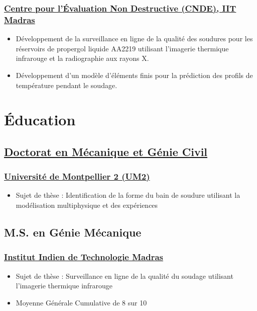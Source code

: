 \documentclass{my_cv}%
\begin{document}
\subsubsection{\href{https://www.cnde.in/}{Centre pour l'Évaluation Non Destructive (CNDE), IIT Madras}}
\begin{itemize}[leftmargin=0.15in]
\setlength\itemsep{-0.1em}
\color{mygray}
\item Développement de la surveillance en ligne de la qualité des soudures pour les réservoirs de propergol liquide AA2219 utilisant l'imagerie thermique infrarouge et la radiographie aux rayons X.
\item Développement d'un modèle d'éléments finis pour la prédiction des profils de température pendant le soudage.
\end{itemize}
\section{Éducation}
\vspace{2em}
\subsection{\href{https://adum.fr/as/ed/cv.pl?mat=39446&site=adumR} {Doctorat en Mécanique et Génie Civil}}
\subsubsection{\faInstitution \hspace{0.2em} \href{https://www.umontpellier.fr/en/}{Université de Montpellier 2 (UM2)}}
\begin{itemize}[leftmargin=0.15in]
\setlength\itemsep{-0.1em}
\color{mygray}
\item Sujet de thèse : Identification de la forme du bain de soudure utilisant la modélisation multiphysique et des expériences
\end{itemize}
{\color{mygray1} \hdashrule[0.1ex]{18.8cm}{0.2mm}{1mm}}
\subsection{M.S. en Génie Mécanique}
\subsubsection{\faInstitution \hspace{0.2em} \href{https://www.iitm.ac.in/}{Institut Indien de Technologie Madras}}
\begin{itemize}[leftmargin=0.15in]
\setlength\itemsep{-0.1em}
\color{mygray}
\item Sujet de thèse : Surveillance en ligne de la qualité du soudage utilisant l'imagerie thermique infrarouge
\item Moyenne Générale Cumulative de 8 sur 10
\end{itemize}
{\color{mygray1} \hdashrule[0.1ex]{18.8cm}{0.2mm}{1mm}}
\end{document}

